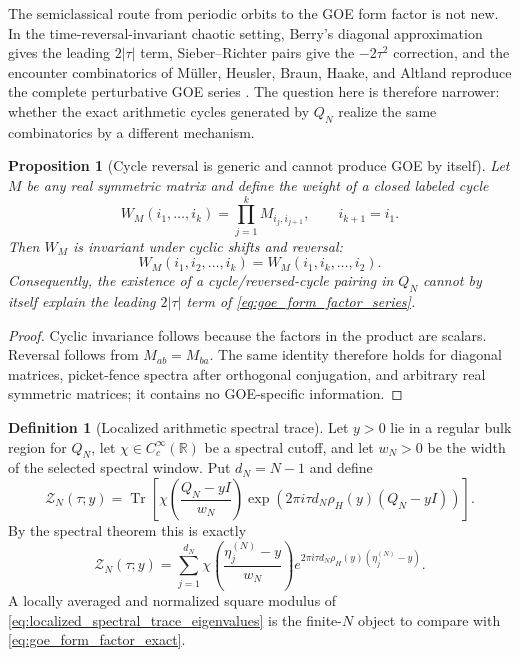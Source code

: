 \documentclass[11pt]{amsart}
\numberwithin{equation}{section}
\theoremstyle{plain}
\newtheorem{proposition}[theorem]{Proposition}
\theoremstyle{definition}
\newtheorem{definition}[theorem]{Definition}
\theoremstyle{remark}
\newcommand{\Tr}{\operatorname{Tr}}
\begin{document}
The semiclassical route from periodic orbits to the GOE form factor is not new.  In the time-reversal-invariant chaotic setting, Berry's diagonal approximation gives the leading $2|\tau|$ term, Sieber--Richter pairs give the $-2\tau^2$ correction, and the encounter combinatorics of M\"uller, Heusler, Braun, Haake, and Altland reproduce the complete perturbative GOE series \cite{Berry1985,SieberRichter2001,MullerEtAl2004,MullerEtAl2005}.  The question here is therefore narrower: whether the exact arithmetic cycles generated by $Q_N$ realize the same combinatorics by a different mechanism.

\begin{proposition}[Cycle reversal is generic and cannot produce GOE by itself]
\label{prop:cycle_reversal_generic}
Let $M$ be any real symmetric matrix and define the weight of a closed labeled cycle
\begin{equation}
W_M(i_1,\ldots,i_k)
=\prod_{j=1}^{k}M_{i_j,i_{j+1}},
\qquad i_{k+1}=i_1.
\label{eq:cycle_weight_general}
\end{equation}
Then $W_M$ is invariant under cyclic shifts and reversal:
\begin{equation}
W_M(i_1,i_2,\ldots,i_k)
=W_M(i_1,i_k,\ldots,i_2).
\label{eq:cycle_reversal_identity}
\end{equation}
Consequently, the existence of a cycle/reversed-cycle pairing in $Q_N$ cannot by itself explain the leading $2|\tau|$ term of \eqref{eq:goe_form_factor_series}.
\end{proposition}

\begin{proof}
Cyclic invariance follows because the factors in the product are scalars.  Reversal follows from $M_{ab}=M_{ba}$.  The same identity therefore holds for diagonal matrices, picket-fence spectra after orthogonal conjugation, and arbitrary real symmetric matrices; it contains no GOE-specific information.
\end{proof}

\begin{definition}[Localized arithmetic spectral trace]
\label{def:localized_spectral_trace}
Let $y>0$ lie in a regular bulk region for $Q_N$, let $\chi\in C_c^\infty(\mathbb R)$ be a spectral cutoff, and let $w_N>0$ be the width of the selected spectral window.  Put $d_N=N-1$ and define
\begin{equation}
\mathcal Z_N(\tau;y)
=
\Tr\!\left[
\chi\!\left(\frac{Q_N-yI}{w_N}\right)
\exp\!\left(
2\pi i\tau d_N\rho_H(y)(Q_N-yI)
\right)
\right].
\label{eq:localized_spectral_trace}
\end{equation}
By the spectral theorem this is exactly
\begin{equation}
\mathcal Z_N(\tau;y)
=
\sum_{j=1}^{d_N}
\chi\!\left(\frac{\eta_j^{(N)}-y}{w_N}\right)
 e^{2\pi i\tau d_N\rho_H(y)(\eta_j^{(N)}-y)}.
\label{eq:localized_spectral_trace_eigenvalues}
\end{equation}
A locally averaged and normalized square modulus of \eqref{eq:localized_spectral_trace_eigenvalues} is the finite-$N$ object to compare with \eqref{eq:goe_form_factor_exact}.
\end{definition}
\end{document}
